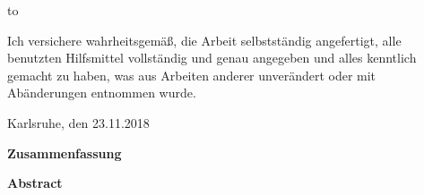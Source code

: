 \thispagestyle{empty}
\vspace*{42\baselineskip}
\hbox to \textwidth{\hrulefill}
\par
Ich versichere wahrheitsgemäß, die Arbeit selbstständig angefertigt, alle benutzten Hilfsmittel vollständig und genau angegeben und alles kenntlich gemacht zu haben, was aus Arbeiten anderer unverändert oder mit Abänderungen entnommen wurde.

Karlsruhe, den 23.11.2018

\cleardoublepage

\vspace*{1em}
\begin{center}
	\textbf{Zusammenfassung}
\end{center}
\par
{}
\cleardoublepage
\vspace*{1em}
\begin{center}
	\textbf{Abstract}
\end{center}
\par
{}

\cleardoublepage

